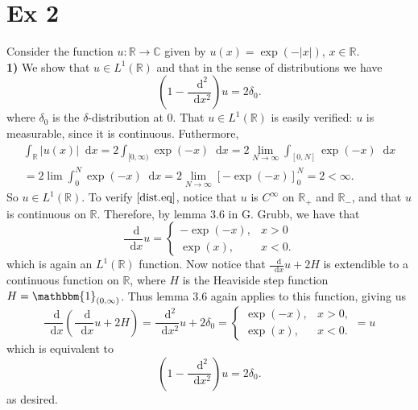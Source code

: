 \documentclass[a4paper,11pt]{article}
\newcommand{\abs}[1]{\left\lvert #1 \right\rvert}
\newcommand*\diff{\mathop{}\!\mathrm{d}}
\newcommand{\R}{\mathbb{R}}
\newcommand{\C}{\mathbb{C}}
\numberwithin{equation}{section}
\begin{document}
\section*{Ex 2}
Consider the function $ u:\R\to\C $ given by $ u(x)=\exp(-\abs{x}) $, $ x\in\R $.\\
\textbf{1)} We show that $ u\in L^1(\R) $ and that in the sense of distributions we have \begin{equation}\label{dist.eq}
\left(1-\frac{\diff^2}{\diff x^2}\right)u=2\delta_0.
\end{equation}
where $ \delta_0 $ is the $ \delta $-distribution at $ 0 $.
That $ u\in L^1(\R) $ is easily verified: $ u $ is measurable, since it is continuous. Futhermore, \begin{equation}
\begin{aligned}
\int_\R \abs{u(x)}\diff x=2\int_{[0,\infty)}\exp(-x)\diff x=2\lim\limits_{N\to\infty}\int_{[0,N]}\exp(-x)\diff x\\
=2\lim\int_{0}^{N}\exp(-x)\diff x=2\lim\limits_{N\to\infty}\left[-\exp(-x)\right]_0^N=2<\infty.
\end{aligned}
\end{equation}
So $ u\in L^1(\R) $. To verify $ \eqref{dist.eq} $, notice that $ u $ is $ C^\infty $ on $ \R_+ $ and $ \R_- $, and that $ u $ is continuous on $ \R $. Therefore, by lemma 3.6 in G. Grubb, we have that \begin{equation}
 \frac{\diff}{\diff x}u=\begin{cases}
 -\exp(-x),&x>0\\
 \exp(x),&x<0.
 \end{cases}
\end{equation}
which is again an $ L^1(\R) $ function. Now notice that $ \frac{\diff}{\diff x}u+2H $ is extendible to a continuous function on $ \R $, where $ H $ is the Heaviside step function $ H=\mathbbm{1}_{(0,\infty)} $. Thus lemma 3.6 again applies to this function, giving us\begin{equation}
\frac{\diff}{\diff x}\left(\frac{\diff}{\diff x}u+2H\right)=\frac{\diff^2}{\diff x^2}u+2\delta_0=\begin{cases}
\exp(-x),&x>0,\\
\exp(x),&x<0.
\end{cases}=u
\end{equation}
which is equivalent to \begin{equation}
\left(1-\frac{\diff^2}{\diff x^2}\right)u=2\delta_0.
\end{equation}
as desired.\\
\end{document}
